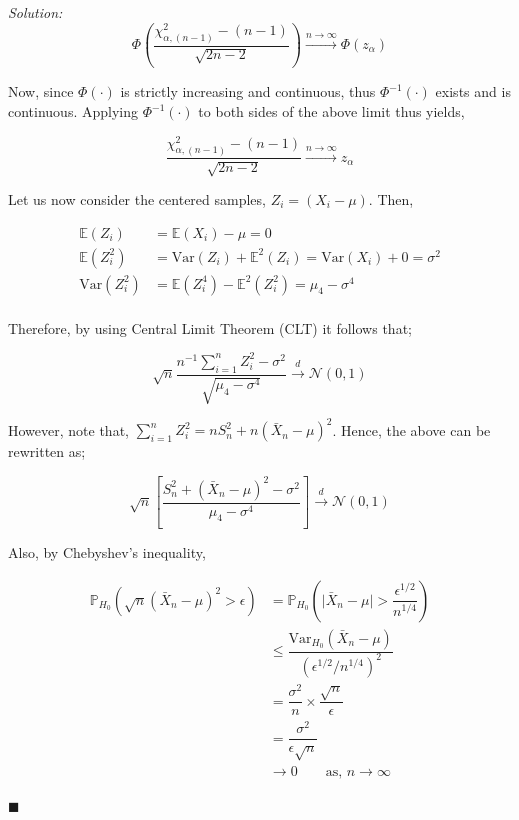 \documentclass[12pt]{article}
\newcommand{\E}{\mathbb{E}}
\newcommand{\Var}{\text{Var}}
\newcommand{\prob}{\mathbb{P}}
\newcommand{\normal}{\mathcal{N}}
\theoremstyle{definition}
\newenvironment{answer}{\textit{Solution: }\quad }{ \hfill $\blacksquare$}
\numberwithin{equation}{section}
\begin{document}
\begin{answer}
    $$
    \Phi\left( \dfrac{\chi^2_{\alpha, (n-1)} - (n-1)}{\sqrt{2n - 2}} \right) \xrightarrow{n \rightarrow \infty} \Phi(z_\alpha)
    $$

    Now, since $\Phi(\cdot)$ is strictly increasing and continuous, thus $\Phi^{-1}(\cdot)$ exists and is continuous. Applying $\Phi^{-1}(\cdot)$ to both sides of the above limit thus yields,

    \begin{equation}
        \dfrac{\chi^2_{\alpha, (n-1)} - (n-1)}{\sqrt{2n - 2}} \xrightarrow{n\rightarrow \infty} z_\alpha
        \label{eqn:5-4}
    \end{equation}

    Let us now consider the centered samples, $Z_i = (X_i - \mu)$. Then, 
    
    \begin{align*}
        \E(Z_i) & = \E(X_i) - \mu = 0\\
        \E(Z_i^2) & = \Var(Z_i) + \E^2(Z_i) = \Var(X_i) + 0 = \sigma^2\\
        \Var(Z_i^2) & = \E(Z_i^4) - \E^2(Z_i^2) = \mu_4 - \sigma^4\\       
    \end{align*}

    Therefore, by using Central Limit Theorem (CLT) it follows that;

    \begin{equation*}
        \sqrt{n} \dfrac{n^{-1}\sum_{i=1}^{n} Z_i^2 - \sigma^2}{\sqrt{\mu_4 - \sigma^4}} \xrightarrow{d} \normal(0, 1)
    \end{equation*}

    However, note that, $\sum_{i=1}^{n} Z_i^2 = nS_n^2 + n(\bar{X}_n - \mu)^2$. Hence, the above can be rewritten as;

    \begin{equation}
        \sqrt{n}  \left[\dfrac{S_n^2 + (\bar{X}_n - \mu)^2 - \sigma^2}{\mu_4 - \sigma^4}\right] \xrightarrow{d} \normal(0, 1)
        \label{eqn:5-5}
    \end{equation}
    
    Also, by Chebyshev's inequality,

    \begin{align*}
        \prob_{H_0}(\sqrt{n} (\bar{X}_n - \mu)^2 > \epsilon)
        & = \prob_{H_0}\left( \vert \bar{X}_n - \mu \vert > \dfrac{\epsilon^{1/2}}{n^{1/4}} \right)\\
        & \leq \dfrac{\Var_{H_0}(\bar{X}_n - \mu)}{\left(\epsilon^{1/2} / n^{1/4} \right)^2}\\
        & = \dfrac{\sigma^2}{n} \times \dfrac{\sqrt{n}}{\epsilon}\\
        & = \dfrac{\sigma^2}{\epsilon\sqrt{n}}\\
        & \rightarrow 0  \qquad \text{as, } n \rightarrow \infty
    \end{align*}


\end{answer}
\end{document}
